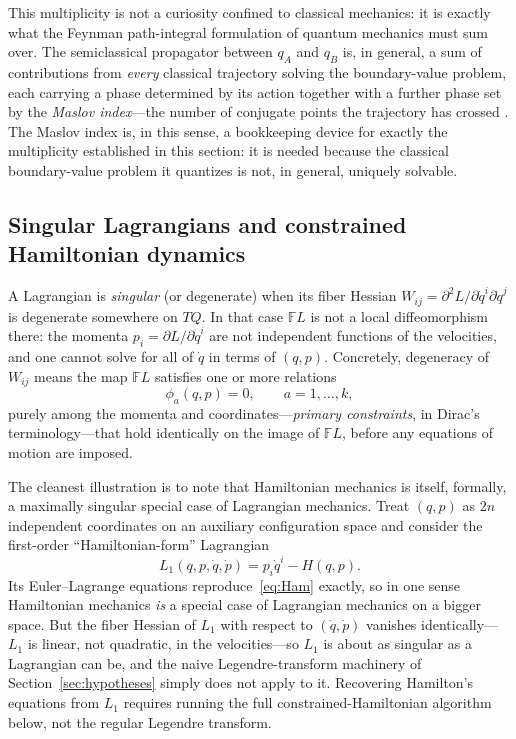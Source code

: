 \documentclass[11pt]{article}
\newcommand{\FL}{\mathbb{F}L}
\begin{document}
This multiplicity is not a curiosity confined to classical mechanics: it is exactly what the Feynman path-integral formulation of quantum mechanics must sum over. The semiclassical propagator between $q_A$ and $q_B$ is, in general, a sum of contributions from \emph{every} classical trajectory solving the boundary-value problem, each carrying a phase determined by its action together with a further phase set by the \emph{Maslov index}---the number of conjugate points the trajectory has crossed \citep{gray2009}. The Maslov index is, in this sense, a bookkeeping device for exactly the multiplicity established in this section: it is needed because the classical boundary-value problem it quantizes is not, in general, uniquely solvable.

\subsection{Singular Lagrangians and constrained Hamiltonian dynamics}
\label{sec:singular}

A Lagrangian is \emph{singular} (or degenerate) when its fiber Hessian $W_{ij} = \partial^2 L/\partial \dot q^i \partial \dot q^j$ is degenerate somewhere on $TQ$. In that case $\FL$ is not a local diffeomorphism there: the momenta $p_i = \partial L/\partial \dot q^i$ are not independent functions of the velocities, and one cannot solve for all of $\dot q$ in terms of $(q,p)$. Concretely, degeneracy of $W_{ij}$ means the map $\FL$ satisfies one or more relations
\begin{equation}
\phi_a(q,p) = 0, \qquad a = 1,\dots,k,
\end{equation}
purely among the momenta and coordinates---\emph{primary constraints}, in Dirac's terminology---that hold identically on the image of $\FL$, before any equations of motion are imposed.

The cleanest illustration is to note that Hamiltonian mechanics is itself, formally, a maximally singular special case of Lagrangian mechanics. Treat $(q,p)$ as $2n$ independent coordinates on an auxiliary configuration space and consider the first-order ``Hamiltonian-form'' Lagrangian
\begin{equation}
L_1(q,p,\dot q,\dot p) = p_i \dot q^i - H(q,p).
\end{equation}
Its Euler--Lagrange equations reproduce~\eqref{eq:Ham} exactly, so in one sense Hamiltonian mechanics \emph{is} a special case of Lagrangian mechanics on a bigger space. But the fiber Hessian of $L_1$ with respect to $(\dot q,\dot p)$ vanishes identically---$L_1$ is linear, not quadratic, in the velocities---so $L_1$ is about as singular as a Lagrangian can be, and the naive Legendre-transform machinery of Section~\ref{sec:hypotheses} simply does not apply to it. Recovering Hamilton's equations from $L_1$ requires running the full constrained-Hamiltonian algorithm below, not the regular Legendre transform.
\end{document}

